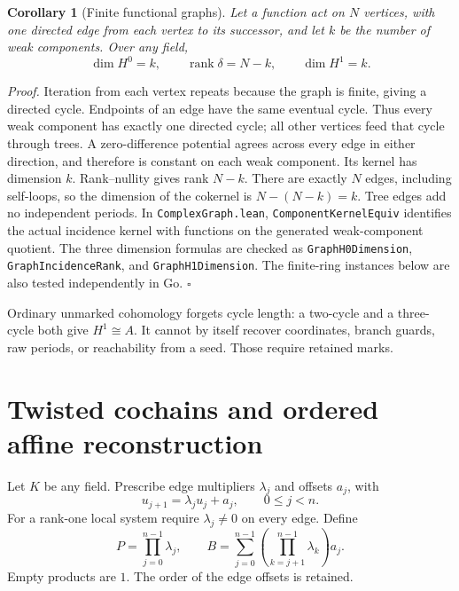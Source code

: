 \documentclass[11pt,letterpaper]{article}
\newtheorem{corollary}[theorem]{Corollary}
\newenvironment{proof}{\noindent\textit{Proof.}}{\hfill\(\square\)}
\begin{document}
\begin{corollary}[Finite functional graphs]
Let a function act on \(N\) vertices, with one directed edge from each vertex to its successor, and let \(k\) be the number of weak components. Over any field,
\[
\dim H^0=k,\qquad \operatorname{rank}\delta=N-k,\qquad \dim H^1=k.
\]
\end{corollary}
\begin{proof}
Iteration from each vertex repeats because the graph is finite, giving a directed cycle. Endpoints of an edge have the same eventual cycle. Thus every weak component has exactly one directed cycle; all other vertices feed that cycle through trees. A zero-difference potential agrees across every edge in either direction, and therefore is constant on each weak component. Its kernel has dimension \(k\). Rank--nullity gives rank \(N-k\). There are exactly \(N\) edges, including self-loops, so the dimension of the cokernel is \(N-(N-k)=k\). Tree edges add no independent periods. In \texttt{Complex\allowbreak Graph.\allowbreak lean}, \texttt{Component\allowbreak Kernel\allowbreak Equiv} identifies the actual incidence kernel with functions on the generated weak-component quotient. The three dimension formulas are checked as \texttt{Graph\allowbreak H0\allowbreak Dimension}, \texttt{Graph\allowbreak Incidence\allowbreak Rank}, and \texttt{Graph\allowbreak H1\allowbreak Dimension}. The finite-ring instances below are also tested independently in Go.
\end{proof}

Ordinary unmarked cohomology forgets cycle length: a two-cycle and a three-cycle both give \(H^1\cong A\). It cannot by itself recover coordinates, branch guards, raw periods, or reachability from a seed. Those require retained marks.

\section{Twisted cochains and ordered affine reconstruction}

Let \(K\) be any field. Prescribe edge multipliers \(\lambda_j\) and offsets \(a_j\), with
\[
u_{j+1}=\lambda_j u_j+a_j,\qquad 0\le j<n.
\]
For a rank-one local system require \(\lambda_j\ne0\) on every edge. Define
\[
P=\prod_{j=0}^{n-1}\lambda_j,\qquad
B=\sum_{j=0}^{n-1}\left(\prod_{k=j+1}^{n-1}\lambda_k\right)a_j.
\]
Empty products are \(1\). The order of the edge offsets is retained.
\end{document}
